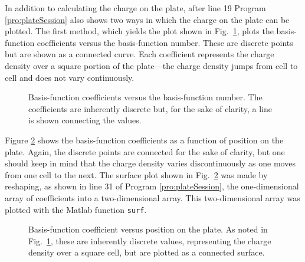 In addition to calculating the charge on the plate, after line 19
Program \ref{pro:plateSession} also shows two ways in which the charge
on the plate can be plotted.  The first method, which yields the plot
shown in Fig.\ \ref{fig:anVsNumber}, plots the basis-function
coefficients versus the basis-function number.  These are discrete
points but are shown as a connected curve.  Each coefficient
represents the charge density over a square portion of the plate---the
charge density jumps from cell to cell and does not vary continuously.
\begin{figure}
  \begin{center}
  \end{center} \caption{Basis-function coefficients versus the
  basis-function number.  The coefficients are inherently discrete but,
  for the sake of clarity, a line is shown connecting the values.}
  \label{fig:anVsNumber} 
\end{figure}

Figure \ref{fig:anVsPosition} shows the basis-function coefficients as
a function of position on the plate.  Again, the discrete points are
connected for the sake of clarity, but one should keep in mind that
the charge density varies discontinuously as one moves from one cell to
the next.  The surface plot shown in Fig.\ \ref{fig:anVsPosition} was
made by reshaping, as shown in line 31 of Program
\ref{pro:plateSession}, the one-dimensional array of coefficients into
a two-dimensional array.  This two-dimensional array was plotted 
with the Matlab function {\tt surf}.
\begin{figure}
  \begin{center}
  \end{center} \caption{Basis-function coefficient versus position on
  the plate.  As noted in Fig.\ \ref{fig:anVsNumber}, these are inherently
  discrete values, representing the charge density over a square cell,
  but are plotted as a connected surface.}  \label{fig:anVsPosition}
\end{figure}

